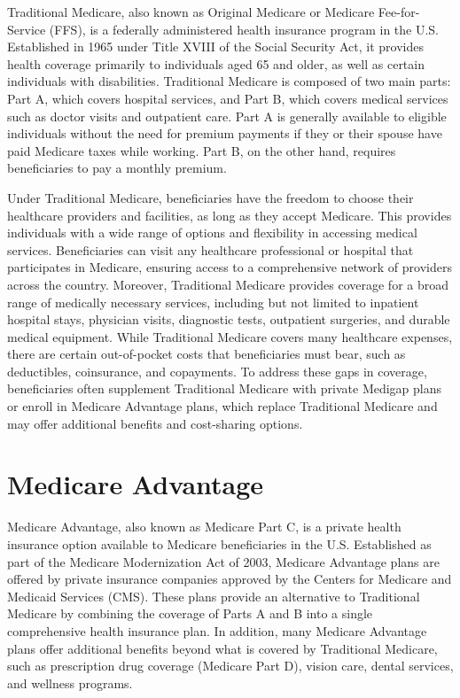 \documentclass[
  letterpaper,
  DIV=11,
  numbers=noendperiod]{scrreport}
\theoremstyle{definition}
\theoremstyle{remark}
\begin{document}
Traditional Medicare, also known as Original Medicare or Medicare
Fee-for-Service (FFS), is a federally administered health insurance
program in the U.S. Established in 1965 under Title XVIII of the Social
Security Act, it provides health coverage primarily to individuals aged
65 and older, as well as certain individuals with disabilities.
Traditional Medicare is composed of two main parts: Part A, which covers
hospital services, and Part B, which covers medical services such as
doctor visits and outpatient care. Part A is generally available to
eligible individuals without the need for premium payments if they or
their spouse have paid Medicare taxes while working. Part B, on the
other hand, requires beneficiaries to pay a monthly premium.

Under Traditional Medicare, beneficiaries have the freedom to choose
their healthcare providers and facilities, as long as they accept
Medicare. This provides individuals with a wide range of options and
flexibility in accessing medical services. Beneficiaries can visit any
healthcare professional or hospital that participates in Medicare,
ensuring access to a comprehensive network of providers across the
country. Moreover, Traditional Medicare provides coverage for a broad
range of medically necessary services, including but not limited to
inpatient hospital stays, physician visits, diagnostic tests, outpatient
surgeries, and durable medical equipment. While Traditional Medicare
covers many healthcare expenses, there are certain out-of-pocket costs
that beneficiaries must bear, such as deductibles, coinsurance, and
copayments. To address these gaps in coverage, beneficiaries often
supplement Traditional Medicare with private Medigap plans or enroll in
Medicare Advantage plans, which replace Traditional Medicare and may
offer additional benefits and cost-sharing options.

\hypertarget{medicare-advantage}{%
\section{Medicare Advantage}\label{medicare-advantage}}

Medicare Advantage, also known as Medicare Part C, is a private health
insurance option available to Medicare beneficiaries in the U.S.
Established as part of the Medicare Modernization Act of 2003, Medicare
Advantage plans are offered by private insurance companies approved by
the Centers for Medicare and Medicaid Services (CMS). These plans
provide an alternative to Traditional Medicare by combining the coverage
of Parts A and B into a single comprehensive health insurance plan. In
addition, many Medicare Advantage plans offer additional benefits beyond
what is covered by Traditional Medicare, such as prescription drug
coverage (Medicare Part D), vision care, dental services, and wellness
programs.
\end{document}
